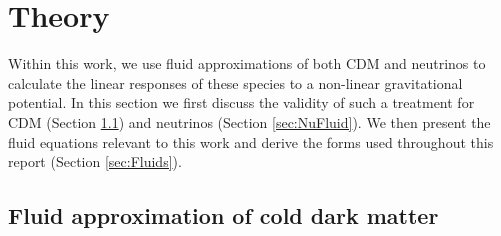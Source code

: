 \documentclass[twocolumn,superscriptaddress,prd]{revtex4}
\begin{document}



\section{Theory}
\label{sec:Theory}

Within this work, we use fluid approximations of both CDM 
and neutrinos to calculate the linear responses of these species
to a non-linear gravitational potential.  
In this section we first discuss the validity of such a
treatment for CDM (Section \ref{sec:CDMFluid}) and
neutrinos (Section \ref{sec:NuFluid}).  We then present the fluid
equations relevant to this work and derive the forms used throughout
this report (Section \ref{sec:Fluids}).

\subsection{ Fluid approximation of cold dark matter }
\label{sec:CDMFluid}
\end{document}
